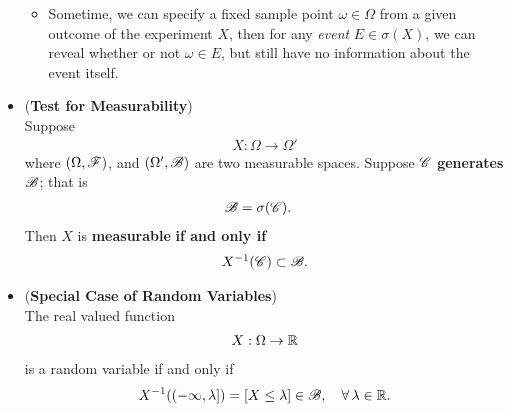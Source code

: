 \documentclass[11pt]{article}
\begin{document}
\begin{itemize}
\begin{remark}
\begin{itemize}
\item Sometime, we can specify a fixed sample point $\omega\in \Omega$ from a given outcome of the experiment $X$, then for any \emph{event} $E\in \sigma(X)$, we can reveal whether or not $\omega\in E$, but still have no information about the event itself. \\
\end{itemize} 
\end{remark}

\item \begin{proposition} (\textbf{Test for Measurability})\citep{resnick2013probability}\\
 Suppose
  \begin{align*}
 X: \Omega \rightarrow \Omega'
\end{align*}
where $(\Omega, {\mathscr F})$, and $(\Omega', {\mathscr B})$ are two measurable spaces. Suppose ${\mathscr C}$ \textbf{generates} ${\mathscr B}$;
that is
\begin{align*}
{\mathscr B} &= \sigma({\mathscr C}).
\end{align*}
Then $X$ is \textbf{measurable} \textbf{if and only if}
\begin{align*}
X^{-1}({\mathscr C}) \subset {\mathscr B}.
\end{align*}
\end{proposition}

\item \begin{corollary} (\textbf{Special Case of Random Variables}) \citep{resnick2013probability}\\
The real valued function 
  \begin{align*}
 X: \Omega \rightarrow {\mathbb R}
\end{align*}
 is a random variable if and only if
\begin{align*}
X^{-1}((-\infty, \lambda])= [X \le \lambda] \in {\mathscr B}, \quad \forall \, \lambda \in {\mathbb R}.
\end{align*}

\end{corollary}


%
%
\end{itemize}
\end{document}
